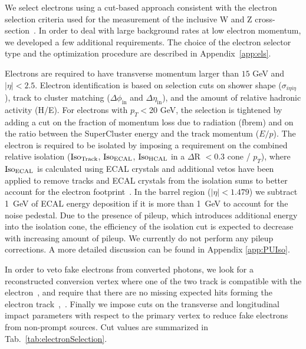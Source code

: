We select electrons using a cut-based approach consistent with the electron 
selection criteria used for the measurement of the inclusive W and Z 
cross-section~\cite{VBTFCrossSectionNote}. In order to deal with large 
background rates at low electron momentum, we developed a few additional 
requirements. The choice of the electron selector type and the optimization procedure
are described in Appendix~\ref{app:els}.

Electrons are required to have transverse momentum larger than $15$ GeV and $|\eta| < 2.5$. 
Electron identification is based on selection cuts on shower shape ($\sigma_{i\eta i\eta}$), 
track to cluster matching ($\Delta \phi_{\mathrm{in}}$ and $\Delta \eta_{\mathrm{in}}$), and the amount 
of relative hadronic activity (H/E). 
For electrons with $p_T<$20 GeV, the selection is tightened by adding a cut on the fraction of momentum 
loss due to radiation (fbrem) and on the ratio between the SuperCluster energy and the track momentum ($E/p$).
The electron is required to be isolated by imposing a requirement on the combined relative isolation 
($\rm{Iso}_{Track}$, $\rm{Iso}_{ECAL}$, $\rm{Iso}_{HCAL}$ in a $\Delta$R $< 0.3$ cone / $p_{T}$), 
where $\rm{Iso}_{ECAL}$ is calculated using ECAL crystals and additional vetos have been 
applied to remove tracks and ECAL crystals from the isolation sums to better account for 
the electron footprint~\cite{ElIso}. In the barrel region ($|\eta| < 1.479$) we subtract 1~GeV of 
ECAL energy deposition if it is more than 1~GeV to account for the noise pedestal. 
Due to the presence of pileup, which introduces additional energy into 
the isolation cone, the efficiency of the isolation cut is expected
to decrease with increasing amount of pileup. We currently do not perform
any pileup corrections. A more detailed discussion can be found in Appendix
\ref{app:PUIso}.

In order to veto fake electrons from converted photons, we look for a reconstructed conversion vertex where 
one of the two track is compatible with the electron~\cite{ConversionNote}, 
and require that there are no missing expected hits forming the electron track~\cite{ConversionNote},~\cite{NExpHits}. 
Finally we impose cuts on the transverse and longitudinal impact parameters with
respect to the primary vertex to reduce fake electrons from non-prompt
sources. Cut values are summarized in Tab.~\ref{tab:electronSelection}.

